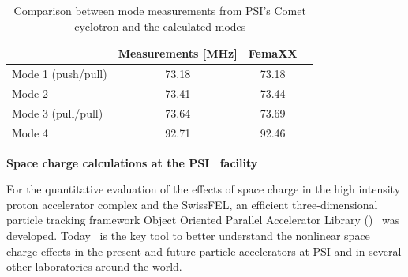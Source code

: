\documentclass[11pt,pdftex]{article}
\begin{document}
\begin{table}[h]\footnotesize
  \caption{Comparison between mode measurements from  PSI's Comet
    cyclotron and the calculated modes}
  \begin{center}  
    \begin{tabular}{lccc} 
      \hline 
      & Measurements [MHz]  & FemaXX \cite{geus:02}  \\
      \hline
      Mode 1 (push/pull)	& 73.18	& 73.18   \\
      Mode 2	&73.41	&73.44 \\
      Mode 3 (pull/pull) &	73.64	&73.69 \\
      Mode 4 &	92.71&	92.46 \\
      \hline
    \end{tabular}
    \label{tab:cometmeas}
  \end{center}
\end{table}


\noindent \textbf{{Space charge calculations at the PSI \hipa\ facility}}

For the quantitative evaluation of the effects of space charge in the
high intensity proton accelerator complex and the SwissFEL, an efficient
three-dimensional particle tracking framework Object Oriented Parallel
Accelerator Library (\opal)~\cite{opal:1} was developed.  Today \opal\
is the key tool to better understand the nonlinear space charge effects
in the present and future particle accelerators at PSI and in several
other laboratories around the world.
\end{document}
